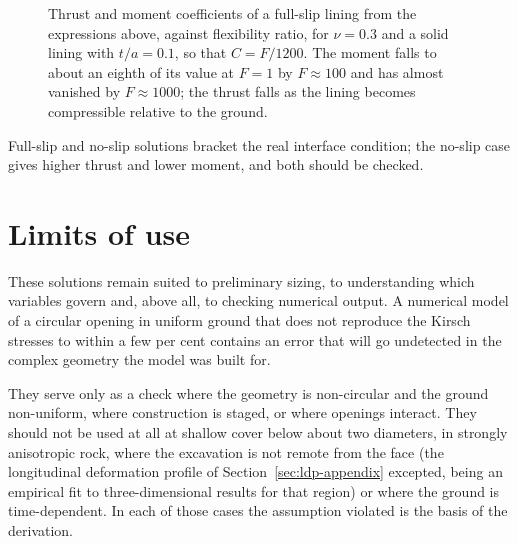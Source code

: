 \begin{figure}[htbp]
\centering
{}
\caption{Thrust and moment coefficients of a full-slip lining from the expressions above, against flexibility ratio, for $\nu = 0.3$ and a solid lining with $t/a = 0.1$, so that $C = F/1200$. The moment falls to about an eighth of its value at $F = 1$ by $F \approx 100$ and has almost vanished by $F \approx 1000$; the thrust falls as the lining becomes compressible relative to the ground.}
\label{fig:einstein-schwartz}
\end{figure}

Full-slip and no-slip solutions bracket the real interface condition; the
no-slip case gives higher thrust and lower moment, and both should be checked.

\section{Limits of use}
\label{sec:closed-form-limits}

These solutions remain suited to preliminary sizing, to
understanding which variables govern and, above all, to checking
numerical output. A numerical model of a circular opening in uniform ground
that does not reproduce the Kirsch stresses to within a few per cent contains
an error that will go undetected in the complex geometry the model was
built for.

They serve only as a check where the geometry is non-circular and the ground
non-uniform, where construction is staged, or where openings interact. They
should not be used at all at shallow cover below about two diameters, in
strongly anisotropic rock, where the excavation is not remote from the face
(the longitudinal deformation profile of Section~\ref{sec:ldp-appendix}
excepted, being an empirical fit to three-dimensional results for
that region) or where the ground is time-dependent. In each of those cases the assumption
violated is the basis of the derivation.

\chapterreferences
